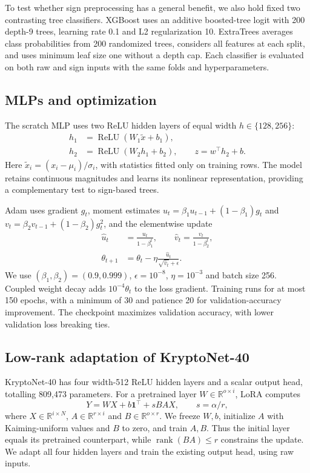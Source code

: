\documentclass{article}
\begin{document}
To test whether sign preprocessing has a general benefit, we also hold fixed two contrasting tree classifiers. XGBoost \cite{chen2016} uses an additive boosted-tree logit with 200 depth-9 trees, learning rate 0.1 and L2 regularization 10. ExtraTrees \cite{geurts2006} averages class probabilities from 200 randomized trees, considers all features at each split, and uses minimum leaf size one without a depth cap. Each classifier is evaluated on both raw and sign inputs with the same folds and hyperparameters.

\subsection{MLPs and optimization}
The scratch MLP uses two ReLU hidden layers of equal width $h\in\{128,256\}$:
\begin{align}
h_1&=\operatorname{ReLU}(W_1\tilde x+b_1),\nonumber\\
h_2&=\operatorname{ReLU}(W_2h_1+b_2),\qquad z=w^\top h_2+b.
\end{align}
Here $\tilde x_i=(x_i-\mu_i)/\sigma_i$, with statistics fitted only on training rows. The model retains continuous magnitudes and learns its nonlinear representation, providing a complementary test to sign-based trees.

Adam \cite{kingma2015} uses gradient $g_t$, moment estimates $u_t=\beta_1u_{t-1}+(1-\beta_1)g_t$ and $v_t=\beta_2v_{t-1}+(1-\beta_2)g_t^2$, and the elementwise update
\begin{align}
\hat u_t&=\frac{u_t}{1-\beta_1^t},\qquad \hat v_t=\frac{v_t}{1-\beta_2^t},\nonumber\\
\theta_{t+1}&=\theta_t-\eta\frac{\hat u_t}{\sqrt{\hat v_t}+\epsilon}.
\end{align}
We use $(\beta_1,\beta_2)=(0.9,0.999)$, $\epsilon=10^{-8}$, $\eta=10^{-3}$ and batch size 256. Coupled weight decay adds $10^{-4}\theta_t$ to the loss gradient. Training runs for at most 150 epochs, with a minimum of 30 and patience 20 for validation-accuracy improvement. The checkpoint maximizes validation accuracy, with lower validation loss breaking ties.

\subsection{Low-rank adaptation of KryptoNet-40}
KryptoNet-40 has four width-512 ReLU hidden layers and a scalar output head, totalling 809,473 parameters. For a pretrained layer $W\in\mathbb R^{o\times i}$, LoRA \cite{hu2022} computes
\begin{equation}
Y=WX+b\mathbf1^\top+sBAX,\qquad s=\alpha/r,
\label{eq:lora}
\end{equation}
where $X\in\mathbb R^{i\times N}$, $A\in\mathbb R^{r\times i}$ and $B\in\mathbb R^{o\times r}$. We freeze $W,b$, initialize $A$ with Kaiming-uniform values and $B$ to zero, and train $A,B$. Thus the initial layer equals its pretrained counterpart, while $\operatorname{rank}(BA)\leq r$ constrains the update. We adapt all four hidden layers and train the existing output head, using raw inputs.
\end{document}
